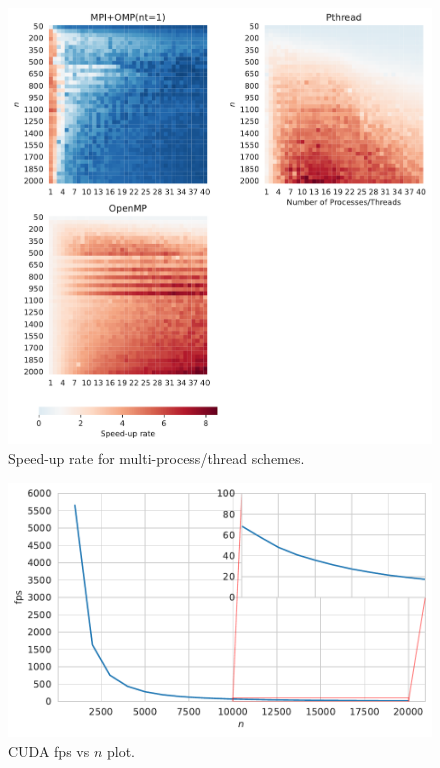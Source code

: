 \documentclass[twoside,12pt]{article}
\theoremstyle{definition}
\theoremstyle{remark}
\begin{document}
\begin{figure}[h!]
    \centering
    \includegraphics[width=\textwidth]{../analysis/heatmap-rate-cpu.pdf}
    \caption{Speed-up rate for multi-process/thread schemes.}
    \label{fig:heatmap-rate-cpu}
\end{figure}


\begin{figure}[t!]
    \centering
    \includegraphics[width=\textwidth]{../analysis/fps-dim-gpu.pdf}
    \caption{CUDA fps vs $n$ plot.}
    \label{fig:fps-dim-gpu}
\end{figure}
\end{document}
